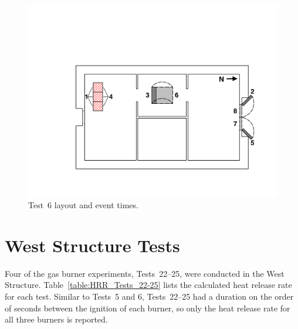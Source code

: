 \begin{figure}[!ht]
\begin{minipage}[b]{0.98\columnwidth}
\begin{center}
\end{center}
\end{minipage}
\begin{minipage}[b]{\columnwidth}
	\vspace{20pt}
	\centering
	\includegraphics[width=0.8\columnwidth]{Figures/Floor_Plans/East_Structure_Test_6}
\end{minipage}
\renewcommand{\baselinestretch}{1}
\caption{Test~6 layout and event times.}
\label{fig:east_test_6}
\end{figure}
\FloatBarrier

\section{West Structure Tests}

Four of the gas burner experiments, Tests~22--25, were conducted in the West Structure. Table~\ref{table:HRR_Tests_22-25} lists the calculated heat release rate for each test. Similar to Tests~5 and 6, Tests~22--25 had a duration on the order of seconds between the ignition of each burner, so only the heat release rate for all three burners is reported.

